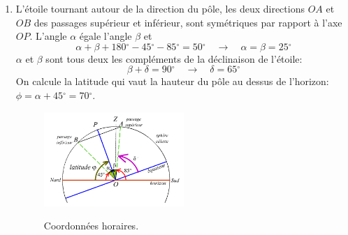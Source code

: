 \documentclass[a4paper,10pt]{report}
\renewcommand{\deg}{\ensuremath{^{\circ}}}
\begin{document}
\begin{Answer}
  \begin{enumerate}
  \item L'étoile tournant autour de la direction du pôle, les deux
    directions $OA$ et $OB$ des passages supérieur et inférieur, sont
    symétriques par rapport à l'axe $OP$. L'angle $\alpha$ égale
    l'angle $\beta$ et
    $$
    \alpha + \beta+180\deg - 45\deg -85\deg = 50\deg
    \quad\to\quad
    \alpha=\beta=25\deg
    $$
    $\alpha$ et $\beta$ sont tous deux les compléments de la
    déclinaison de l'étoile:
    $$
    \beta+\delta = 90\deg
    \quad\to\quad
    \delta=65\deg
    $$
    On calcule la latitude qui vaut la hauteur du pôle au dessus de
    l'horizon: $\phi=\alpha+45\deg=70\deg$.

    \begin{figure}[htp]
      \centering
      \includegraphics[width=0.5\textwidth]{coordonnees_horaire3}
      \label{coordonneeshoraire3}
      \caption{Coordonnées horaires.}
    \end{figure}


\end{enumerate}
\end{Answer}
\end{document}
